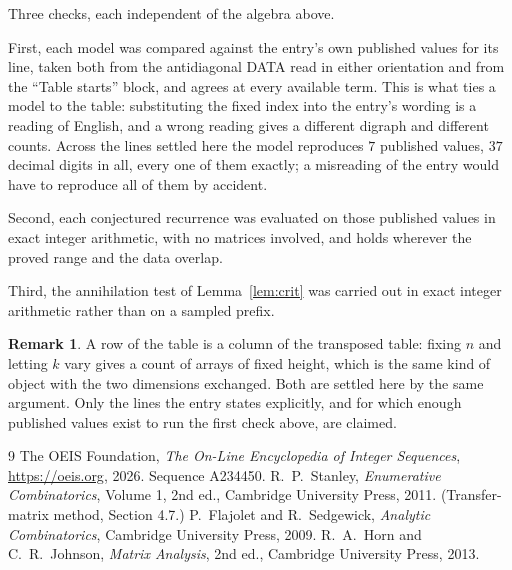 \documentclass[11pt,a4paper]{article}
\theoremstyle{plain}
\theoremstyle{definition}
\newtheorem{remark}[theorem]{Remark}
\begin{document}
Three checks, each independent of the algebra above.

First, each model was compared against the entry's own published values for its line, taken
both from the antidiagonal DATA read in either orientation and from the ``Table starts''
block, and agrees at every available term. This is what ties a model to the table:
substituting the fixed index into the entry's wording is a reading of English, and a wrong
reading gives a different digraph and different counts. Across the lines settled here the
model reproduces $7$ published values, $37$ decimal digits in all, every one of
them exactly; a misreading of the entry would have to reproduce all of them by accident.

Second, each conjectured recurrence was evaluated on those published values in exact
integer arithmetic, with no matrices involved, and holds wherever the proved range and the
data overlap.

Third, the annihilation test of Lemma~\ref{lem:crit} was carried out in exact integer
arithmetic rather than on a sampled prefix.

\begin{remark}
A row of the table is a column of the transposed table: fixing $n$ and letting $k$ vary gives a
count of arrays of fixed height, which is the same kind of object with the two dimensions
exchanged. Both are settled here by the same argument. Only the lines the entry states
explicitly, and for which enough published values exist to run the first check above, are
claimed.
\end{remark}

\begin{thebibliography}{9}
 The OEIS Foundation, \emph{The On-Line Encyclopedia of Integer
Sequences}, \url{https://oeis.org}, 2026. Sequence A234450.
 R.~P.~Stanley, \emph{Enumerative Combinatorics}, Volume 1, 2nd ed.,
Cambridge University Press, 2011. (Transfer-matrix method, Section 4.7.)
 P.~Flajolet and R.~Sedgewick, \emph{Analytic Combinatorics}, Cambridge
University Press, 2009.
 R.~A.~Horn and C.~R.~Johnson, \emph{Matrix Analysis}, 2nd ed., Cambridge
University Press, 2013.
\end{thebibliography}
\end{document}
